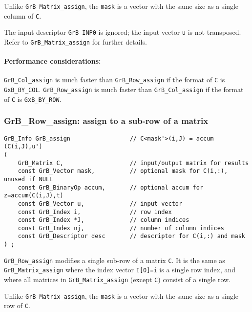 \documentclass[12pt]{article}
\begin{document}
{Unlike \verb'GrB_Matrix_assign', the \verb'mask' is a vector with the same size
as a single column of \verb'C'.

The input descriptor \verb'GrB_INP0' is ignored; the input vector \verb'u' is
not transposed.  Refer to \verb'GrB_Matrix_assign' for further details.

\paragraph{\bf Performance considerations:} %
\verb'GrB_Col_assign' is much faster than \verb'GrB_Row_assign' if the format
of \verb'C' is \verb'GxB_BY_COL'.  \verb'GrB_Row_assign' is much faster than
\verb'GrB_Col_assign' if the format of \verb'C' is \verb'GxB_BY_ROW'.

\newpage
\subsubsection{{\sf GrB\_Row\_assign:} assign to a sub-row of a matrix}
\label{assign_row}

\begin{mdframed}[userdefinedwidth=6in]
{\footnotesize
\begin{verbatim}
GrB_Info GrB_assign                 // C<mask'>(i,J) = accum (C(i,J),u')
(
    GrB_Matrix C,                   // input/output matrix for results
    const GrB_Vector mask,          // optional mask for C(i,:), unused if NULL
    const GrB_BinaryOp accum,       // optional accum for z=accum(C(i,J),t)
    const GrB_Vector u,             // input vector
    const GrB_Index i,              // row index
    const GrB_Index *J,             // column indices
    const GrB_Index nj,             // number of column indices
    const GrB_Descriptor desc       // descriptor for C(i,:) and mask
) ;
\end{verbatim} } \end{mdframed}

\verb'GrB_Row_assign' modifies a single sub-row of a matrix \verb'C'.  It is
the same as \verb'GrB_Matrix_assign' where the index vector \verb'I[0]=i' is
a single row index, and where all matrices in \verb'GrB_Matrix_assign'
(except \verb'C') consist of a single row.

Unlike \verb'GrB_Matrix_assign', the \verb'mask' is a vector with the same size
as a single row of \verb'C'.

}
\end{document}
